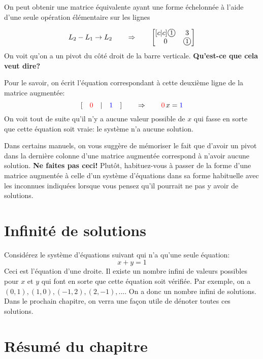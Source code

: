 On peut obtenir une matrice équivalente ayant
une forme échelonnée à l'aide d'une seule opération
élémentaire sur les lignes

\[
L_2 - L_1 \rightarrow L_2 \qquad \Rightarrow\qquad
\begin{bmatrix}[c|c]
\mbox{\large{\textcircled{\small $1$}}} & 3\\
0 & \mbox{\large{\textcircled{\small $1$}}}
\end{bmatrix}
\]
On voit qu'on a un pivot du côté droit de la barre verticale. \textbf{Qu'est-ce que cela
veut dire?}

Pour le savoir, on écrit l'équation correspondant à cette deuxième ligne de la matrice augmentée:
\[
[\quad{\color{red}0}\quad|\quad{\color{blue}1}\quad] \qquad \Rightarrow\qquad {\color{red}0}\,x = {\color{blue}1}
\]
On voit tout de suite qu'il n'y a aucune valeur
possible de $x$ qui fasse en sorte que cette équation soit vraie: le système n'a aucune solution.

\begin{NotDef}
Dans certains manuels, on vous suggère de mémoriser le fait que d'avoir un pivot dans la dernière colonne d'une matrice augmentée correspond à n'avoir aucune solution. \textbf{Ne faites pas ceci!} Plutôt, habituez-vous à passer de la forme d'une matrice augmentée à celle d'un système d'équations dans sa forme habituelle avec les inconnues indiquées lorsque vous pensez
qu'il pourrait ne pas y avoir de solutions.
\end{NotDef}

\section{Infinité de solutions}

Considérez le système d'équations suivant qui
n'a qu'une seule équation:
\[
 x + y = 1
\]
Ceci est l'équation d'une droite. Il existe un nombre infini de
valeurs possibles pour $x$ et $y$ qui font en sorte que cette équation soit vérifiée.  Par exemple, on a $(0, 1), (1, 0), (-1, 2), (2, -1), \ldots$. 
On a donc un nombre infini de solutions.  
Dans le prochain chapitre, on verra une façon utile de dénoter toutes ces solutions.

\section{Résumé du chapitre}

